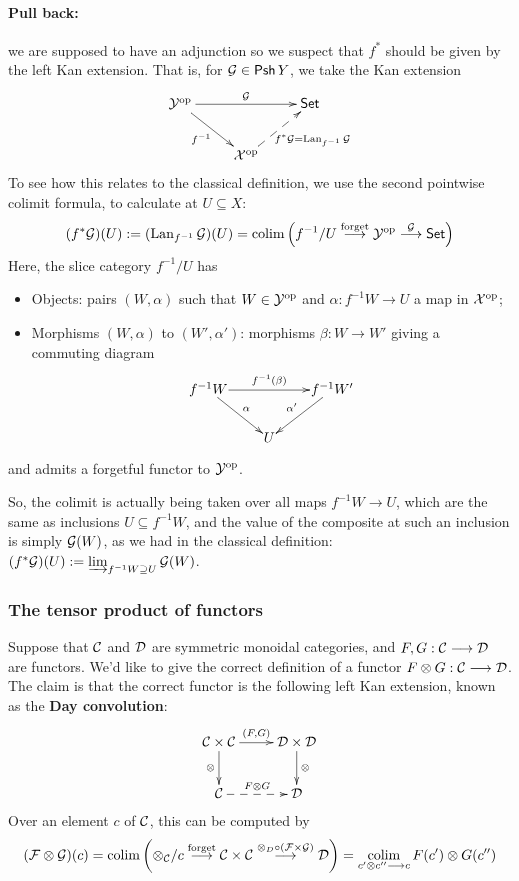 \documentclass[11pt]{article}
\begin{document}
\begin{2. Kan Extensions}
\begin{shaded}
\paragraph*{Pull back:} we are supposed to have an adjunction 
so we suspect that $f^*$ should be given by the left Kan extension. That is, for $\mathcal{G}\in\operatorname{{\mathsf{Psh}}} Y$, we take the Kan extension
\[\vcenter{\xymatrix{
\calY^\op\ar[rd]_-{f^{-1}} \ar[rr]^-{\calG}_-{}="arF"&%
&%
\Set\\%
&%
\calX^\op\ar@{-->}[ur]_{f^*\calG=\Lan_{f^{-1}}\calG} %
}}
\]
To see how this relates to the classical definition, we use the second pointwise colimit formula, to calculate at $U\subseteq X$:
\[(f^*\mathcal{G})(U):=(\operatorname{Lan}_{f^{-1}}\mathcal{G})(U)= \operatorname*{colim}\left(f^{-1}/U \overset{\textup{forget}}{\longrightarrow}\mathcal{Y}^{\textup{op}}\overset{\mathcal{G}}{\longrightarrow}\operatorname{{\mathsf{Set}}}\right)\]
Here, the slice category $f^{-1}/U$ has 
\begin{itemize}\squishlist
\item Objects: pairs $(W,\alpha)$ such that $W\in\mathcal{Y}^{\textup{op}}$ and $\alpha:f^{-1}W\to U$ a map in $\mathcal{X}^{\textup{op}}$;
\item Morphisms $(W,\alpha)$ to $(W',\alpha')$: morphisms $\beta:W\to W'$ giving a commuting diagram \[
\vcenter{\xymatrix@1{
f^{-1}W\ar[rd]^-{\alpha}
\ar[rr]^-{f^{-1}(\beta)}
&&%
f^{-1}W'\ar[ld]_-{\alpha'}\\%
&U&%
}}\]
\end{itemize}
and admits a forgetful functor to $\mathcal{Y}^{\textup{op}}$.

So, the colimit is actually being taken over all maps $f^{-1}W\to U$, which are the same as inclusions $U\subseteq f^{-1}W$, and the value of the composite at such an inclusion is simply $\mathcal{G}(W)$, as we had in the classical definition: $(f^*\mathcal{G})(U):=\varinjlim_{f^{-1}W\supseteq U}\mathcal{G}(W)$.
\subsubsection*{The tensor product of functors}
Suppose that $\mathcal{C}$ and $\mathcal{D}$ are symmetric monoidal categories, and $F,G:\mathcal{C}\longrightarrow\mathcal{D}$ are functors. We'd like to give the correct definition of a functor $F\otimes G:\mathcal{C}\longrightarrow\mathcal{D}$. The claim is that the correct functor is the following left Kan extension, known as the \textbf{Day convolution}:
\[\xymatrix{
\calC\times\calC\ar[r]^-{(F,G)} \ar[d]_-{\otimes}&%
\calD\times\calD\ar[d]^-{\otimes}\\%
\calC\ar@{-->}[r]^-{F\otimes G}&%
\calD%
}\]
Over an element $c$ of $\mathcal{C}$, this can be computed by
\[(\mathcal{F}\otimes\mathcal{G})(c)= \operatorname*{colim}\left(\otimes_{\mathcal{C}}/c \overset{\textup{forget}}{\longrightarrow}\mathcal{C}\times\mathcal{C} \overset{\otimes_D\circ(\mathcal{F}\times\mathcal{G})}{\longrightarrow}\mathcal{D}\right)=\operatorname*{colim}_{c'\otimes c''\longrightarrow c}F(c')\otimes G(c'')\]

\end{shaded}
\end{2. Kan Extensions}
\end{document}
